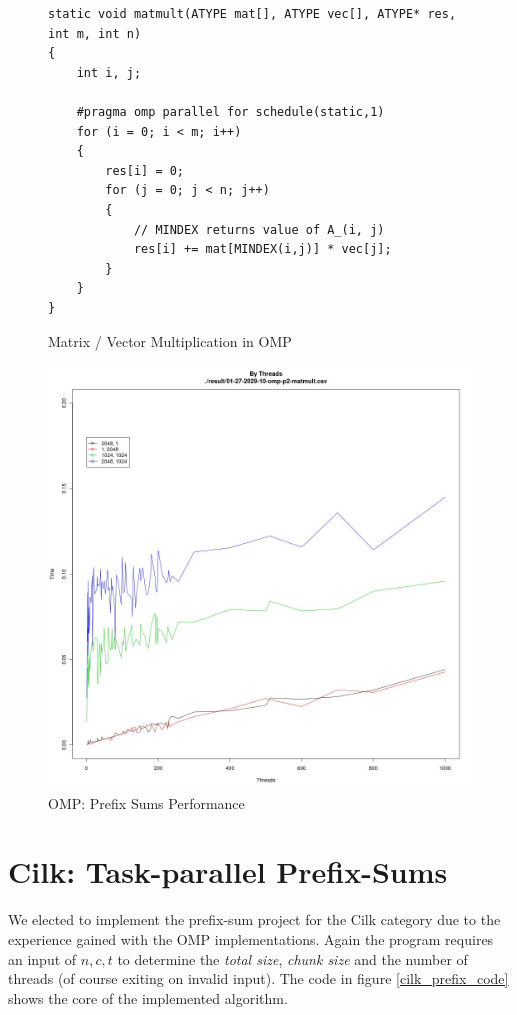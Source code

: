 \documentclass[11pt]{article}
\begin{document}
\begin{figure}[H]
\label{omp_matmult_code}
\caption{Matrix / Vector Multiplication in OMP}
\begin{lstlisting}
static void matmult(ATYPE mat[], ATYPE vec[], ATYPE* res, int m, int n)
{
	int i, j;

	#pragma omp parallel for schedule(static,1)
	for (i = 0; i < m; i++) 
	{
		res[i] = 0;
		for (j = 0; j < n; j++) 
		{
			// MINDEX returns value of A_(i, j)
			res[i] += mat[MINDEX(i,j)] * vec[j];
		}
	}
}
\end{lstlisting}
\end{figure}

\begin{figure}[H]
\centering
\caption{OMP: Prefix Sums Performance}

\includegraphics[scale=0.3]{candidate-graphs/omp_p2_fixed_size_16.jpg}
\end{figure}


\newpage
\section{Cilk: Task-parallel Prefix-Sums}
We elected to implement the prefix-sum project for the Cilk category due to the experience gained with the OMP implementations. Again the program requires an input of $n, c, t$ to determine the \emph{total size}, \emph{chunk size} and the number of threads (of course exiting on invalid input). The code in figure \ref{cilk_prefix_code} shows the core of the implemented algorithm.
\end{document}
